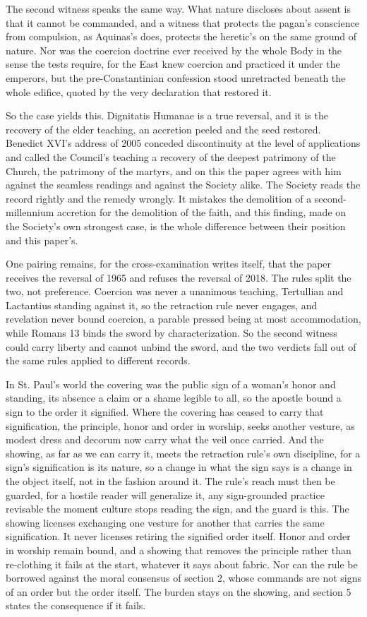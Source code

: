 \documentclass[11pt,twoside]{article}
\newcommand{\unit}[1]{\needspace{3\baselineskip}\par\medskip{\normalfont\bfseries\color{subhead}#1}\par\nobreak\smallskip}
\begin{document}
The second witness speaks the same way. What nature discloses about assent is that it cannot be commanded, and a witness that protects the pagan's conscience from compulsion, as Aquinas's does, protects the heretic's on the same ground of nature. Nor was the coercion doctrine ever received by the whole Body in the sense the tests require, for the East knew coercion and practiced it under the emperors, but the pre-Constantinian confession stood unretracted beneath the whole edifice, quoted by the very declaration that restored it.

So the case yields this. Dignitatis Humanae is a true reversal, and it is the recovery of the elder teaching, an accretion peeled and the seed restored. Benedict XVI's address of 2005 conceded discontinuity at the level of applications and called the Council's teaching a recovery of the deepest patrimony of the Church, the patrimony of the martyrs, and on this the paper agrees with him against the seamless readings and against the Society alike. The Society reads the record rightly and the remedy wrongly. It mistakes the demolition of a second-millennium accretion for the demolition of the faith, and this finding, made on the Society's own strongest case, is the whole difference between their position and this paper's.

One pairing remains, for the cross-examination writes itself, that the paper receives the reversal of 1965 and refuses the reversal of 2018. The rules split the two, not preference. Coercion was never a unanimous teaching, Tertullian and Lactantius standing against it, so the retraction rule never engages, and revelation never bound coercion, a parable pressed being at most accommodation, while Romans 13 binds the sword by characterization. So the second witness could carry liberty and cannot unbind the sword, and the two verdicts fall out of the same rules applied to different records.

\unit{The veil.}
In St. Paul's world the covering was the public sign of a woman's honor and standing, its absence a claim or a shame legible to all, so the apostle bound a sign to the order it signified. Where the covering has ceased to carry that signification, the principle, honor and order in worship, seeks another vesture, as modest dress and decorum now carry what the veil once carried. And the showing, as far as we can carry it, meets the retraction rule's own discipline, for a sign's signification is its nature, so a change in what the sign says is a change in the object itself, not in the fashion around it. The rule's reach must then be guarded, for a hostile reader will generalize it, any sign-grounded practice revisable the moment culture stops reading the sign, and the guard is this. The showing licenses exchanging one vesture for another that carries the same signification. It never licenses retiring the signified order itself. Honor and order in worship remain bound, and a showing that removes the principle rather than re-clothing it fails at the start, whatever it says about fabric. Nor can the rule be borrowed against the moral consensus of section 2, whose commands are not signs of an order but the order itself. The burden stays on the showing, and section 5 states the consequence if it fails.
\end{document}
